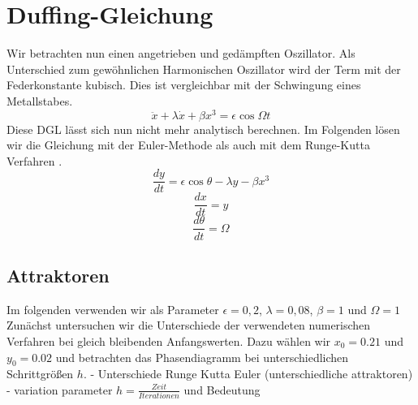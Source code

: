 \documentclass{scrartcl}
\begin{document}
\section { Duffing-Gleichung}
Wir betrachten nun einen angetrieben und gedämpften Oszillator. Als Unterschied zum gewöhnlichen Harmonischen Oszillator wird der Term mit der Federkonstante kubisch. Dies ist vergleichbar mit der Schwingung eines Metallstabes.
\begin{equation} \ddot{x}+\lambda\dot{x}+\beta x^3=\epsilon\cos{\Omega t}\end{equation}
Diese DGL lässt sich nun nicht mehr analytisch berechnen.
Im Folgenden lösen wir die Gleichung mit der Euler-Methode \parencite{wiki:euler} als auch mit dem Runge-Kutta Verfahren \parencite{wiki:runge}.
\begin{equation}\frac{dy}{dt}=\epsilon\cos{\theta}-\lambda y - \beta x^3\end{equation}
\begin{equation}\frac{dx}{dt}=y\end{equation}
\begin{equation}\frac{d\theta}{dt}=\Omega\end{equation}
\subsection { Attraktoren }
Im folgenden verwenden wir als Parameter $\epsilon = 0,2$, $\lambda = 0,08$, $\beta = 1$ und $\Omega = 1$
Zunächst untersuchen wir die Unterschiede der verwendeten numerischen Verfahren bei gleich bleibenden Anfangswerten. Dazu wählen wir $x_0=0.21$ und $y_0=0.02$ und betrachten das Phasendiagramm bei unterschiedlichen Schrittgrößen $h$.
\newline
- Unterschiede Runge Kutta Euler (unterschiedliche attraktoren)
\newline
- variation parameter $h = \frac{Zeit}{Iterationen}$ und Bedeutung
\end{document}

